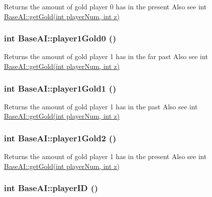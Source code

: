 Returns the amount of gold player 0 has in the present Also see int \hyperlink{classBaseAI_c079405ee4fd5cec789af0f627d3d175}{BaseAI::getGold(int playerNum, int z)} \hypertarget{classBaseAI_f82cc7bd092d0636eb8a8df82a0c5b49}{
\subsubsection[{player1Gold0}]{\setlength{\rightskip}{0pt plus 5cm}int BaseAI::player1Gold0 ()}}
\label{classBaseAI_f82cc7bd092d0636eb8a8df82a0c5b49}


Returns the amount of gold player 1 has in the far past Also see int \hyperlink{classBaseAI_c079405ee4fd5cec789af0f627d3d175}{BaseAI::getGold(int playerNum, int z)} \hypertarget{classBaseAI_cc09926bd744fdf9ec4448366d8b8de7}{
\subsubsection[{player1Gold1}]{\setlength{\rightskip}{0pt plus 5cm}int BaseAI::player1Gold1 ()}}
\label{classBaseAI_cc09926bd744fdf9ec4448366d8b8de7}


Returns the amount of gold player 1 has in the past Also see int \hyperlink{classBaseAI_c079405ee4fd5cec789af0f627d3d175}{BaseAI::getGold(int playerNum, int z)} \hypertarget{classBaseAI_35bad13d289478aa2bb628d6e3c56c52}{
\subsubsection[{player1Gold2}]{\setlength{\rightskip}{0pt plus 5cm}int BaseAI::player1Gold2 ()}}
\label{classBaseAI_35bad13d289478aa2bb628d6e3c56c52}


Returns the amount of gold player 1 has in the present Also see int \hyperlink{classBaseAI_c079405ee4fd5cec789af0f627d3d175}{BaseAI::getGold(int playerNum, int z)} \hypertarget{classBaseAI_16aab1036653c8f8fb5370cf2f6a3e10}{
\subsubsection[{playerID}]{\setlength{\rightskip}{0pt plus 5cm}int BaseAI::playerID ()}}
\label{classBaseAI_16aab1036653c8f8fb5370cf2f6a3e10}


